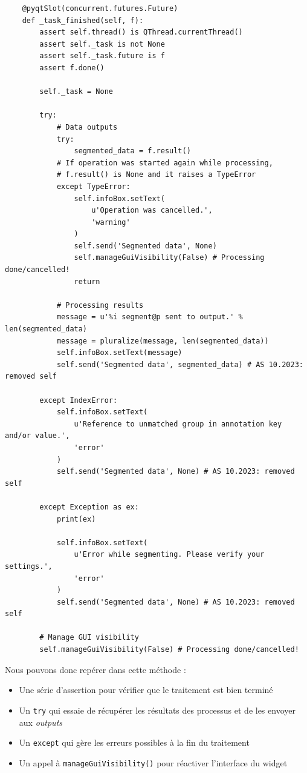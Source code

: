 \documentclass{article}
\begin{document}
\begin{verbatim}
    @pyqtSlot(concurrent.futures.Future)
    def _task_finished(self, f):
        assert self.thread() is QThread.currentThread()
        assert self._task is not None
        assert self._task.future is f
        assert f.done()

        self._task = None

        try:
            # Data outputs
            try:
                segmented_data = f.result()
            # If operation was started again while processing,
            # f.result() is None and it raises a TypeError
            except TypeError:
                self.infoBox.setText(
                    u'Operation was cancelled.',
                    'warning'
                )
                self.send('Segmented data', None)
                self.manageGuiVisibility(False) # Processing done/cancelled!
                return

            # Processing results
            message = u'%i segment@p sent to output.' % len(segmented_data)
            message = pluralize(message, len(segmented_data))
            self.infoBox.setText(message)
            self.send('Segmented data', segmented_data) # AS 10.2023: removed self

        except IndexError:
            self.infoBox.setText(
                u'Reference to unmatched group in annotation key and/or value.',
                'error'
            )
            self.send('Segmented data', None) # AS 10.2023: removed self

        except Exception as ex:
            print(ex)
        
            self.infoBox.setText(
                u'Error while segmenting. Please verify your settings.',
                'error'
            )
            self.send('Segmented data', None) # AS 10.2023: removed self

        # Manage GUI visibility
        self.manageGuiVisibility(False) # Processing done/cancelled!
\end{verbatim}

Nous pouvons donc repérer dans cette méthode :
\begin{itemize}
    \item Une série d'assertion pour vérifier que le traitement est bien terminé
    \item Un \texttt{try} qui essaie de récupérer les résultats des processus et de les envoyer aux \textit{outputs}
    \item Un \texttt{except} qui gère les erreurs possibles à la fin du traitement
    \item Un appel à \texttt{manageGuiVisibility()} pour réactiver l'interface du widget
\end{itemize}
\end{document}
